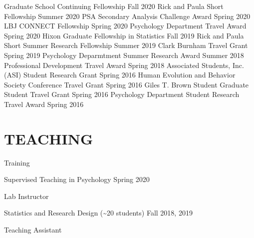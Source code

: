 \documentclass[10.5pt,]{article}
\begin{document}
Graduate School Continuing Fellowship
\hfill \textcolor{light-gray}{Fall 2020} \newline Rick and Paula Short
Fellowship \hfill \textcolor{light-gray}{Summer 2020} \newline PSA
Secondary Analysis Challenge Award
\hfill \textcolor{light-gray}{Spring 2020} \newline LBJ CONNECT
Fellowship \hfill \textcolor{light-gray}{Spring 2020} \newline
Psychology Department Travel Award
\hfill \textcolor{light-gray}{Spring 2020} \newline Hixon Graduate
Fellowship in Statistics \hfill \textcolor{light-gray}{Fall 2019}
\newline Rick and Paula Short Summer Research Fellowship
\hfill \textcolor{light-gray}{Summer 2019} \newline Clark Burnham Travel
Grant \hfill \textcolor{light-gray}{Spring 2019} \newline Psychology
Deparmtment Summer Research Award
\hfill \textcolor{light-gray}{Summer 2018} \newline Professional
Development Travel Award \hfill \textcolor{light-gray}{Spring 2018}
\newline Associated Students, Inc. (ASI) Student Research Grant
\hfill \textcolor{light-gray}{Spring 2016} \newline Human Evolution and
Behavior Society Conference Travel Grant
\hfill \textcolor{light-gray}{Spring 2016} \newline Giles T. Brown
Student Graduate Student Travel Grant
\hfill \textcolor{light-gray}{Spring 2016} \newline Psychology
Department Student Research Travel Award
\hfill \textcolor{light-gray}{Spring 2016}

\newpage

\hypertarget{teaching}{%
\section{TEACHING}\label{teaching}}

\textcolor{light-gray}{Training}

Supervised Teaching in Psychology
\hfill \textcolor{light-gray}{Spring 2020}

\textcolor{light-gray}{Lab Instructor}

Statistics and Research Design (\textasciitilde{}20 students)
\hfill \textcolor{light-gray}{Fall 2018, 2019}

\textcolor{light-gray}{Teaching Assistant}
\end{document}
